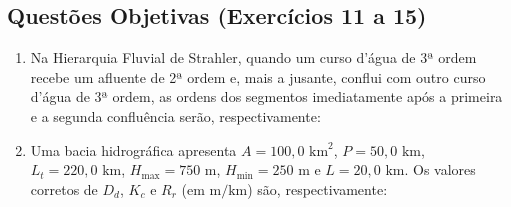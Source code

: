 \subsection*{Questões Objetivas (Exercícios 11 a 15)}

\begin{enumerate}[leftmargin=1.8em, itemsep=5pt, resume]
  \item Na Hierarquia Fluvial de Strahler, quando um curso d'água de 3ª ordem recebe um afluente de 2ª ordem e, mais a jusante, conflui com outro curso d'água de 3ª ordem, as ordens dos segmentos imediatamente após a primeira e a segunda confluência serão, respectivamente:

  \item Uma bacia hidrográfica apresenta $A = 100{,}0\text{ km}^2$, $P = 50{,}0\text{ km}$, $L_t = 220{,}0\text{ km}$, $H_{\max} = 750\text{ m}$, $H_{\min} = 250\text{ m}$ e $L = 20{,}0\text{ km}$. Os valores corretos de $D_d$, $K_c$ e $R_r$ (em $\text{m}/\text{km}$) são, respectivamente:


\end{enumerate}
